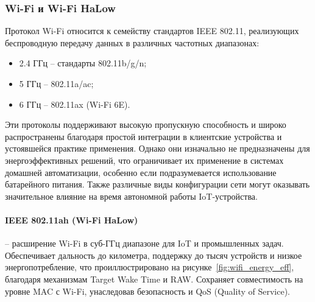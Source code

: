 \documentclass[14pt,a4paper]{extarticle}
\begin{document}
\subsubsection{Wi-Fi и Wi-Fi HaLow}

Протокол Wi-Fi относится к семейству стандартов IEEE 802.11, реализующих беспроводную передачу данных в различных частотных диапазонах:
\begin{itemize}
    \item 2.4 ГГц -- стандарты 802.11b/g/n;
    \item 5 ГГц -- 802.11a/ac;
    \item 6 ГГц -- 802.11ax (Wi-Fi 6E).
\end{itemize}

Эти протоколы поддерживают высокую пропускную способность и широко распространены благодаря простой интеграции в клиентские устройства и устоявшейся практике применения. Однако они
изначально не предназначены для энергоэффективных решений, что ограничивает их применение в системах домашней автоматизации, особенно если подразумевается использование батарейного
питания. Также различные виды конфигурации сети могут оказывать значительное влияние на время автономной работы IoT-устройства. \cite{WifiSmartHome}

\paragraph{IEEE 802.11ah (Wi-Fi HaLow)} -- расширение Wi-Fi в суб-ГГц диапазоне для IoT и промышленных задач. Обеспечивает дальность до километра, поддержку до тысяч устройств и
низкое энергопотребление, что проиллюстрировано на рисунке~\ref{fig:wifi_energy_eff}, благодаря механизмам Target Wake Time и RAW. Сохраняет совместимость на уровне MAC с Wi-Fi,
унаследовав безопасность и QoS (Quality of Service).
\end{document}

